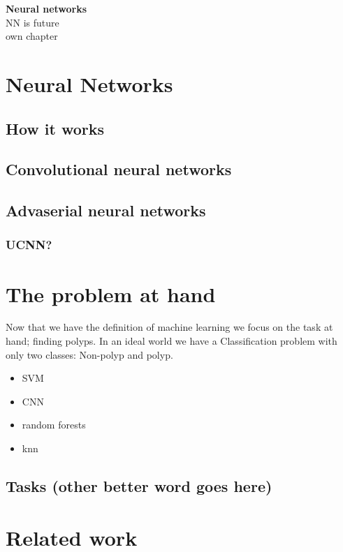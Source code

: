 	  
	  \vspace{5px}
	  \textbf{Neural networks}\\
	  NN is future\\
	  own chapter\\
	  
	
	\section{Neural Networks}
	  
	  
	  \subsection{How it works}
	
	  
	  \subsection{Convolutional neural networks}
	  
	  \subsection{Advaserial neural networks}
	  
	  
	  
	  \subsubsection{UCNN?}
	  
	  
	  
	\section{The problem at hand}
	  Now that we have the definition of machine learning we focus on the task at hand; finding polyps. In an ideal world we have a
	  Classification problem with only two classes: Non-polyp and polyp. 
	  
	  \begin{itemize}
	    \item SVM 
	    \item CNN 
	    \item random forests
	    \item knn
	  \end{itemize}
	  
	
	
	  \subsection{Tasks (other better word goes here)}
	  \label{chap:Tasks}

\section{Related work}